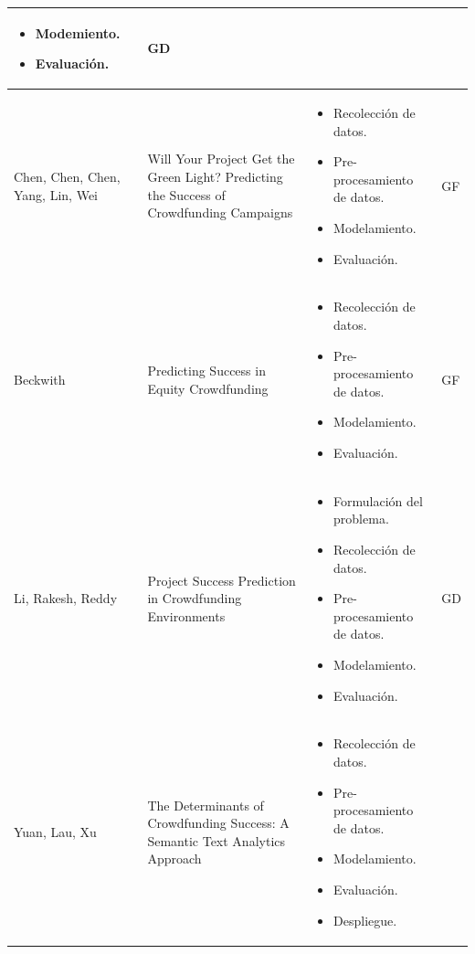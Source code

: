 \begin{longtable}{|M{3cm}|M{5.5cm}|M{5.5cm}|M{1.5cm}|}
\begin{itemize}[noitemsep,leftmargin=*]
				\item Modemiento.
				\item Evaluación.
			\end{itemize}
			& GD
			\\
			\hline
			Chen, Chen, Chen, Yang, Lin, Wei
			& Will Your Project Get the Green Light? Predicting the Success of Crowdfunding Campaigns
			& 
			\begin{itemize}[noitemsep,leftmargin=*]
				\item Recolección de datos.
				\item Pre-procesamiento de datos.
				\item Modelamiento.
				\item Evaluación.
			\end{itemize}
			& GF
			\\
			\hline
			Beckwith
			& Predicting Success in Equity Crowdfunding
			& 
			\begin{itemize}[noitemsep,leftmargin=*]
				\item Recolección de datos.
				\item Pre-procesamiento de datos.
				\item Modelamiento.
				\item Evaluación.
			\end{itemize}
			&  GF
			\\
			\hline
			Li, Rakesh, Reddy
			& Project Success Prediction in Crowdfunding Environments
			& 
			\begin{itemize}[noitemsep,leftmargin=*]
				\item Formulación del problema.
				\item Recolección de datos.
				\item Pre-procesamiento de datos.
				\item Modelamiento.
				\item Evaluación.
			\end{itemize}
			& GD
			\\
			\hline
			Yuan, Lau, Xu
			& The Determinants of Crowdfunding Success: A Semantic Text Analytics Approach
			& 
			\begin{itemize}[noitemsep,leftmargin=*]
				\item Recolección de datos.
				\item Pre-procesamiento de datos.
				\item Modelamiento.
				\item Evaluación.
				\item Despliegue.

\end{itemize}
\end{longtable}
